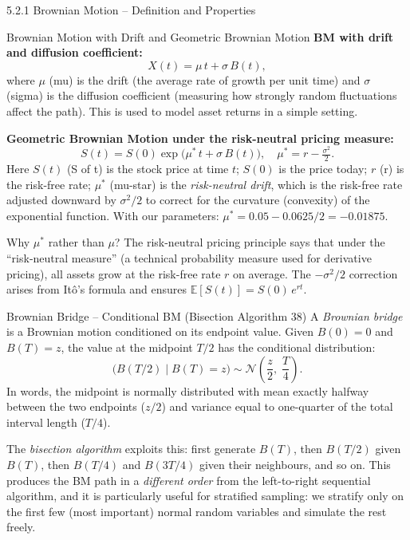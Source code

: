 \documentclass[aspectratio=169,10pt]{beamer}
\begin{document}
\begin{frame}[allowframebreaks]{5.2.1 Brownian Motion -- Definition and Properties}
\framebreak

\begin{block}{Brownian Motion with Drift and Geometric Brownian Motion}
  \textbf{BM with drift and diffusion coefficient:}
  \[
    X(t) = \mu\,t + \sigma\,B(t),
  \]
  where $\mu$ (mu) is the drift (the average rate of growth per unit time) and
  $\sigma$ (sigma) is the diffusion coefficient (measuring how strongly random
  fluctuations affect the path).  This is used to model asset returns in a
  simple setting.

  \medskip
  \textbf{Geometric Brownian Motion under the risk-neutral pricing measure:}
  \[
    S(t) = S(0)\exp\!\bigl(\mu^*\,t + \sigma\,B(t)\bigr),
    \quad \mu^* = r - \tfrac{\sigma^2}{2}.
  \]
  Here $S(t)$ (S of t) is the stock price at time $t$; $S(0)$ is the price
  today; $r$ (r) is the risk-free rate; $\mu^*$ (mu-star) is the
  \emph{risk-neutral drift}, which is the risk-free rate adjusted downward by
  $\sigma^2/2$ to correct for the curvature (convexity) of the exponential
  function.  With our parameters: $\mu^* = 0.05 - 0.0625/2 = -0.01875$.

  Why $\mu^*$ rather than $\mu$?  The risk-neutral pricing principle says that
  under the ``risk-neutral measure'' (a technical probability measure used for
  derivative pricing), all assets grow at the risk-free rate $r$ on average.
  The $-\sigma^2/2$ correction arises from It\^{o}'s formula and ensures
  $\mathbb{E}[S(t)] = S(0)\,e^{rt}$.
\end{block}

\framebreak

\begin{block}{Brownian Bridge -- Conditional BM (Bisection Algorithm 38)}
  A \emph{Brownian bridge} is a Brownian motion conditioned on its endpoint
  value.  Given $B(0) = 0$ and $B(T) = z$, the value at the midpoint $T/2$ has
  the conditional distribution:
  \[
    \bigl(B(T/2) \;\big|\; B(T) = z\bigr) \sim \mathcal{N}\!\left(\frac{z}{2},\; \frac{T}{4}\right).
  \]
  In words, the midpoint is normally distributed with mean exactly halfway
  between the two endpoints ($z/2$) and variance equal to one-quarter of the
  total interval length ($T/4$).

  The \emph{bisection algorithm} exploits this: first generate $B(T)$, then
  $B(T/2)$ given $B(T)$, then $B(T/4)$ and $B(3T/4)$ given their neighbours,
  and so on.  This produces the BM path in a \emph{different order} from the
  left-to-right sequential algorithm, and it is particularly useful for
  stratified sampling: we stratify only on the first few (most important) normal
  random variables and simulate the rest freely.
\end{block}


\end{frame}
\end{document}
